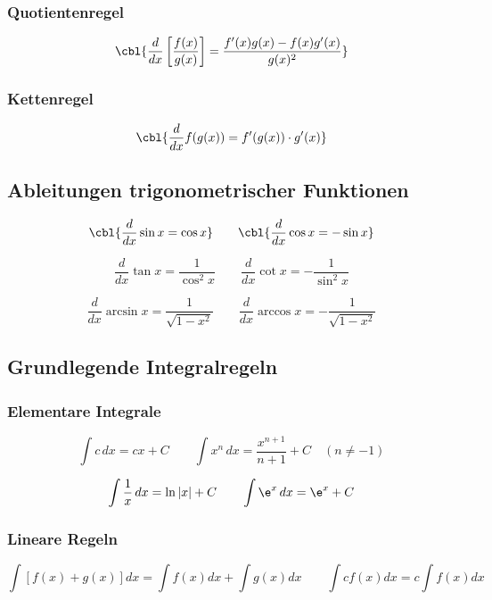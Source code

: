 \subsubsection{Quotientenregel}

\[
\cbl{\frac{d}{dx} \left[ \frac{f(x)}{g(x)} \right]
= \frac{f'(x) g(x) - f(x) g'(x)}{g(x)^2}}
\]

\subsubsection{Kettenregel}

\[
\cbl{\frac{d}{dx} f(g(x)) = f'(g(x)) \cdot g'(x)}
\]

\subsection{Ableitungen trigonometrischer Funktionen}

\[
\cbl{\frac{d}{dx} \sin x = \cos x}
\qquad
\cbl{\frac{d}{dx} \cos x = - \sin x}
\]

\[
\frac{d}{dx} \tan x = \frac{1}{\cos^2 x}
\qquad
\frac{d}{dx} \cot x = - \frac{1}{\sin^2 x}
\]

\[
\frac{d}{dx} \arcsin x = \frac{1}{\sqrt{1-x^2}}
\qquad
\frac{d}{dx} \arccos x = -\frac{1}{\sqrt{1-x^2}}
\]

\subsection{Grundlegende Integralregeln}

\subsubsection{Elementare Integrale}

\[
\int c \, dx = c x + C
\qquad
\int x^n \, dx = \frac{x^{n+1}}{n+1} + C \quad (n \neq -1)
\]

\[
\int \frac{1}{x} \, dx = \ln |x| + C
\qquad
\int \e^{x} \, dx = \e^{x} + C
\]

\subsubsection{Lineare Regeln}

\[
\int [f(x) + g(x)] dx = \int f(x) dx + \int g(x) dx
\qquad
\int c f(x) dx = c \int f(x) dx
\]

